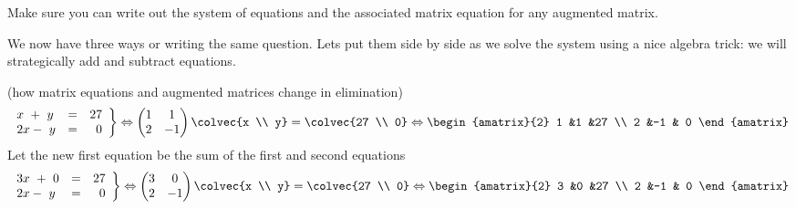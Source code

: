 
Make sure you can write out the system of equations and the associated matrix equation for any augmented matrix. 




We now have three ways or writing the same question. 
Lets put them side by side as we solve the system using a nice algebra trick: we will strategically add and subtract equations.

\begin{example}  (how matrix equations and augmented matrices change in elimination)
\begin{eqnarray*}
   \left.
\begin{array}{lcr}
	x\ +\ y & = & 27 \\
	2x-\ y & = &\  0 
     \end{array}
   \right\} 
   \Leftrightarrow
    \begin{pmatrix}
      1             &1  \\
      2             &-1
    \end{pmatrix}
  \colvec{x \\ y}
  =
  \colvec{27 \\ 0}
  \Leftrightarrow
 \begin{amatrix}{2}
1 &1 &27 \\ 2 &-1 & 0
\end{amatrix}
  \end{eqnarray*}
Let the new first equation be the sum of the first and second equations
\begin{eqnarray*}
   \left.
\begin{array}{lcr}
	3x\ +\ 0 & = & 27 \\
	2x-\ y & = &\  0 
     \end{array}
   \right\} 
   \Leftrightarrow
    \begin{pmatrix}
      3             &0  \\
      2             &-1
    \end{pmatrix}
  \colvec{x \\ y}
  =
  \colvec{27 \\ 0}
  \Leftrightarrow
 \begin{amatrix}{2}
3 &0 &27 \\ 2 &-1 & 0
\end{amatrix}

\end{eqnarray*}
\end{example}
